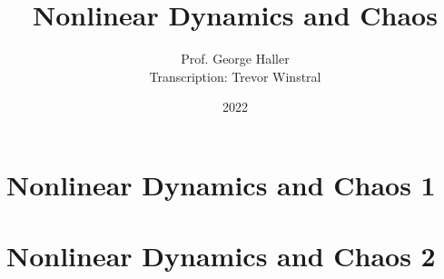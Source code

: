 \documentclass[12pt]{book}
\title{Nonlinear Dynamics and Chaos}
\author{Prof. George Haller\\ Transcription: Trevor Winstral}
\date{2022}
\theoremstyle{definition}
\theoremstyle{remark}
\begin{document}
\maketitle
\tableofcontents 
\newpage

\part{Nonlinear Dynamics and Chaos 1}

\newpage


\newpage


\newpage


\newpage


\newpage


\newpage

\part{Nonlinear Dynamics and Chaos 2}

\newpage
\end{document}
